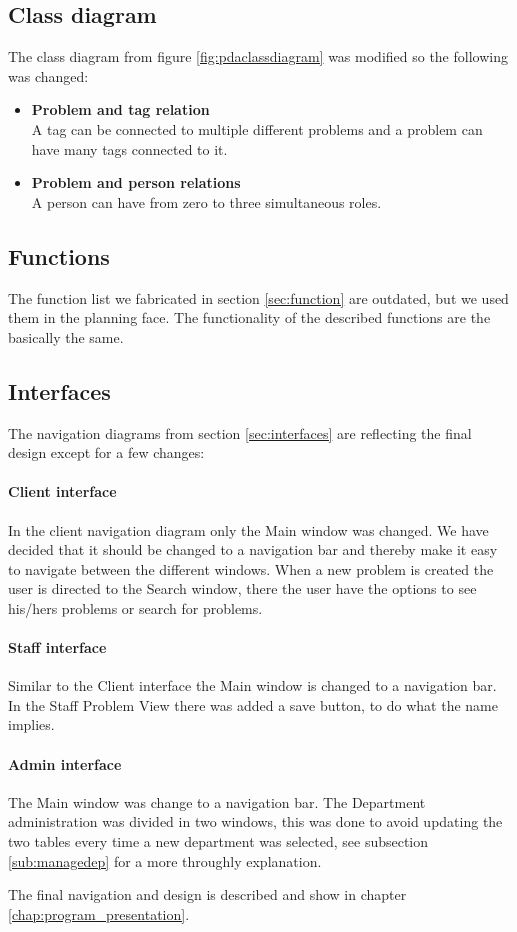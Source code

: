 \subsection{Class diagram}
The class diagram from figure \ref{fig:pdaclassdiagram} was modified so the following was changed:
\begin{itemize}
\item \textbf{Problem and tag relation} \\
					A tag can be connected to multiple different problems and a problem can have many tags connected to it. 
\item \textbf{Problem and person relations} \\
					A person can have from zero to three simultaneous roles.	
\end{itemize}

\subsection{Functions}
The function list we fabricated in section \ref{sec:function} are outdated, but we used them in the planning face. The functionality of the described functions are the basically the same.  

\subsection{Interfaces}
The navigation diagrams from section \ref{sec:interfaces} are reflecting the final design except for a few changes:

\paragraph{Client interface}
In the client navigation diagram only the Main window was changed. We have decided that it should be changed to a navigation bar and thereby make it easy to navigate between the different windows. 
When a new problem is created the user is directed to the Search window, there the user have the options to see his/hers problems or search for problems. 

\paragraph{Staff interface}
Similar to the Client interface the Main window is changed to a navigation bar. In the Staff Problem View there was added a save button, to do what the name implies. 

\paragraph{Admin interface}
The Main window was change to a navigation bar. The Department administration was divided in two windows, this was done to avoid updating the two tables every time a new department was selected, see subsection \ref{sub:managedep} for a more throughly explanation.  

The final navigation and design is described and show in chapter \ref{chap:program_presentation}.

